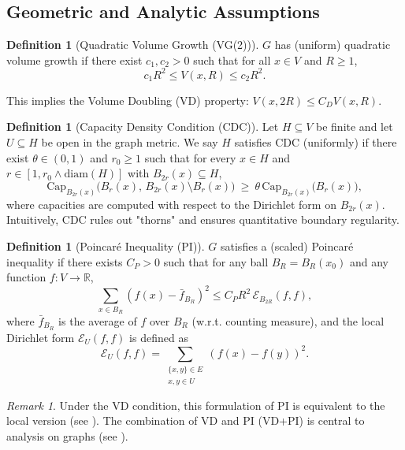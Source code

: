 \documentclass{article}
\numberwithin{equation}{section}
\theoremstyle{definition}
\newtheorem{definition}[theorem]{Definition}
\theoremstyle{remark}
\newtheorem{remark}[theorem]{Remark}
\newcommand{\cE}{\mathcal{E}}
\newcommand{\R}{\mathbb{R}}
\begin{document}
\subsection{Geometric and Analytic Assumptions}

\begin{definition}[Quadratic Volume Growth (VG(2))]
$G$ has (uniform) quadratic volume growth if there exist $c_1, c_2 > 0$ such that for all $x \in V$ and $R \geq 1$,
\begin{equation}\label{eq:quad}
c_1 R^{2} \leq V(x,R) \leq c_2 R^{2}.
\end{equation}
\end{definition}
This implies the Volume Doubling (VD) property: $V(x,2R) \leq C_D V(x,R)$.

\begin{definition}[Capacity Density Condition (CDC)]\label{def:CDC}
Let $H\subseteq V$ be finite and let $U\subseteq H$ be open in the graph metric. We say $H$ satisfies CDC (uniformly) if there exist $\theta\in(0,1)$ and $r_0\ge1$ such that for every $x\in H$ and $r\in[1,r_0\wedge \mathrm{diam}(H)]$ with $B_{2r}(x)\subseteq H$,
\[
  \mathrm{Cap}_{B_{2r}(x)}\big(B_{r}(x),\,B_{2r}(x)\setminus B_{r}(x)\big)\ \ge\ \theta\,\mathrm{Cap}_{B_{2r}(x)}\big(B_{r}(x)\big),
\]
where capacities are computed with respect to the Dirichlet form on $B_{2r}(x)$. Intuitively, CDC rules out "thorns" and ensures quantitative boundary regularity.
\end{definition}

\begin{definition}[Poincaré Inequality (PI)]\label{def:PI}
$G$ satisfies a (scaled) Poincaré inequality if there exists $C_P > 0$ such that for any ball $B_R=B_R(x_0)$ and any function $f: V \to \R$,
\[
\sum_{x \in B_R} (f(x) - \bar{f}_{B_R})^2 \leq C_P R^2 \, \cE_{B_{2R}}(f,f),
\]
where $\bar{f}_{B_R}$ is the average of $f$ over $B_R$ (w.r.t. counting measure), and the local Dirichlet form $\cE_U(f,f)$ is defined as
\[
\cE_U(f,f) = \sum_{\substack{\{x,y\} \in E \\ x,y \in U}} (f(x)-f(y))^2.
\]
\end{definition}

\begin{remark}\label{rem:PI_equivalence}
Under the VD condition, this formulation of PI is equivalent to the local version (see \cite{HajlaszKoskela00}). The combination of VD and PI (VD+PI) is central to analysis on graphs (see \cite{GrigoryanTelcs12}).
\end{remark}
\end{document}
